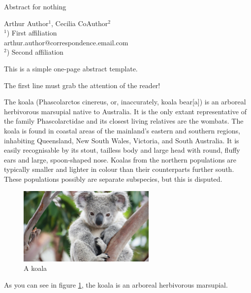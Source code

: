 \documentclass[a4paper]{article}
\begin{document}
\Large
 \begin{center}
Abstract for nothing\\ 

\hspace{10pt}

\large
Arthur Author$^1$, Cecilia CoAuthor$^2$ \\
\hspace{10pt}
\small  
$^1$) First affiliation\\
arthur.author@correspondence.email.com\\
$^2$) Second affiliation
\end{center} %

\hspace{10pt}
\normalsize
This is a simple one-page abstract template.

The first line must grab the attention of the reader!

The koala (Phascolarctos cinereus, or, inaccurately, koala bear[a]) is an arboreal herbivorous marsupial native to Australia. It is the only extant representative of the family Phascolarctidae and its closest living relatives are the wombats. The koala is found in coastal areas of the mainland's eastern and southern regions, inhabiting Queensland, New South Wales, Victoria, and South Australia. It is easily recognisable by its stout, tailless body and large head with round, fluffy ears and large, spoon-shaped nose. Koalas from the northern populations are typically smaller and lighter in colour than their counterparts further south. These populations possibly are separate subspecies, but this is disputed.


\begin{figure}[h]
    \centering
    \includegraphics[width=0.6\textwidth]{figs/koala.jpg}
    \caption{A koala}
    \label{fig:koala}
\end{figure}
 
As you can see in figure \ref{fig:koala}, the koala is an arboreal herbivorous marsupial.
\end{document}
